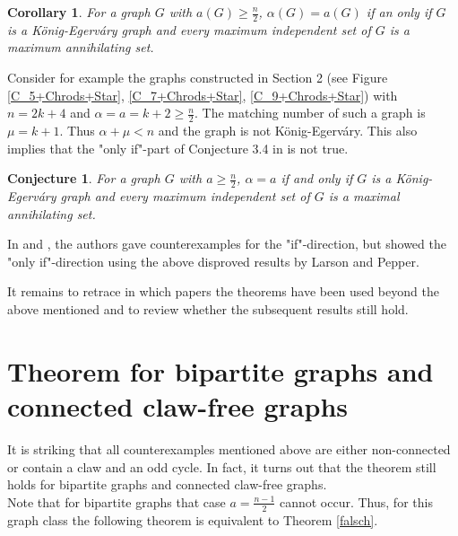 \documentclass{scrartcl}
\newtheorem{corollary}[defsatzusw]{Corollary}
\newtheorem{conjecture}[defsatzusw]{Conjecture}
\begin{document}
	\begin{corollary}\textnormal{\cite{LarsonPepper2011}}
		For a graph $G$ with $a(G)\geq\frac n2$, $\alpha(G)=a(G)$ if an only if $G$ is a König-Egerváry graph and every maximum independent set of $G$ is a maximum annihilating set.
	\end{corollary}

	\noindent
	Consider for example the graphs constructed in Section 2 (see Figure \ref{C_5+Chrods+Star}, \ref{C_7+Chrods+Star}, \ref{C_9+Chrods+Star}) with $n=2k+4$ and $\alpha=a=k+2\geq \frac n2$. 
	The matching number of such a graph is $\mu=k+1$.
	Thus $\alpha+\mu<n$ and the graph is not König-Egerváry.
	This also implies that the "only if"-part of Conjecture 3.4 in \cite{LarsonPepper2011} is not true.
	
	\begin{conjecture}\textnormal{\cite{LarsonPepper2011}}
		For a graph $G$ with $a\geq\frac n2$, $\alpha=a$ if and only if $G$ is a König-Egerváry graph and every maximum independent set of $G$ is a maximal annihilating set.
	\end{conjecture}

	\noindent
	In \cite{LevitMandrescu2018} and \cite{LevitMandrescu2020}, the authors gave counterexamples for the "if"-direction, but showed the "only if"-direction using the above disproved  results by Larson and Pepper. 

	It remains to retrace in which papers the theorems have been used beyond the above mentioned and to review whether the subsequent results still hold.


\newpage

	
	
	
	\section{Theorem for bipartite graphs and connected claw-free graphs}

	It is striking that all counterexamples mentioned above are either non-connected or contain a claw and an odd cycle.
	In fact, it turns out that the theorem still holds for bipartite graphs and connected claw-free graphs.\\
	
	\noindent
	Note that for bipartite graphs that case $a=\frac{n-1}{2}$ cannot occur. Thus, for this graph class the following theorem is equivalent to Theorem \ref{falsch}.
	
\end{document}

